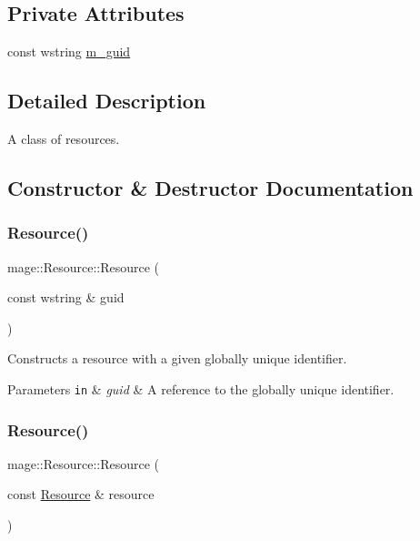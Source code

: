 \subsection*{Private Attributes}
\begin{DoxyCompactItemize}
\item 
const wstring \hyperlink{classmage_1_1_resource_aa5e176b2528581bf1b662f5a77aeef40}{m\+\_\+guid}
\end{DoxyCompactItemize}


\subsection{Detailed Description}
A class of resources. 

\subsection{Constructor \& Destructor Documentation}
\hypertarget{classmage_1_1_resource_a3e2540455d88e1825a680fb4e7fe25c4}{}\label{classmage_1_1_resource_a3e2540455d88e1825a680fb4e7fe25c4} 
\subsubsection{\texorpdfstring{Resource()}{Resource()}\hspace{0.1cm}{\footnotesize\ttfamily [1/3]}}
{\footnotesize\ttfamily mage\+::\+Resource\+::\+Resource (\begin{DoxyParamCaption}\item[{const wstring \&}]{guid }\end{DoxyParamCaption})\hspace{0.3cm}{\ttfamily [explicit]}}

Constructs a resource with a given globally unique identifier.


\begin{DoxyParams}[1]{Parameters}
\mbox{\tt in}  & {\em guid} & A reference to the globally unique identifier. \\
\hline
\end{DoxyParams}
\hypertarget{classmage_1_1_resource_a4ee2dba2675546b603e03a69a2f2db52}{}\label{classmage_1_1_resource_a4ee2dba2675546b603e03a69a2f2db52} 
\subsubsection{\texorpdfstring{Resource()}{Resource()}\hspace{0.1cm}{\footnotesize\ttfamily [2/3]}}
{\footnotesize\ttfamily mage\+::\+Resource\+::\+Resource (\begin{DoxyParamCaption}\item[{const \hyperlink{classmage_1_1_resource}{Resource} \&}]{resource }\end{DoxyParamCaption})\hspace{0.3cm}{\ttfamily [delete]}}


